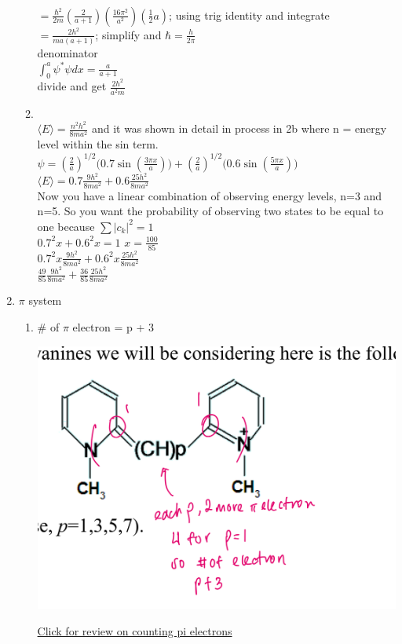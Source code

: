 \documentclass{article}
\begin{document}
\begin{enumerate}
\begin{enumerate}
\\ $= \frac{\hbar^2}{2m}(\frac{2}{a+1})(\frac{16\pi^2}{a^2})(\frac{1}{2}a)$; using trig identity and integrate
\\ $= \frac{2h^2}{ma(a+1)}$; simplify and $\hbar =\frac{h}{2\pi}$
\\ denominator
\\ $\int_0^a \psi^*\psi dx=\frac{a}{a+1}$
\\divide and get $\frac{2h^2}{a^2m}$
\item 
\\ $\langle E\rangle=\frac{n^2h^2}{8ma^2}$ and it was shown in detail in process in 2b where n = energy level within the sin term.
\\ $\psi = (\frac{2}{a})^{1/2}\Big(0.7\sin(\frac{3\pi x}{a})\Big) + (\frac{2}{a})^{1/2}\Big(0.6\sin(\frac{5\pi x}{a})\Big)$
\\ $\langle E\rangle = 0.7\frac{9h^2}{8ma^2} + 0.6\frac{25h^2}{8ma^2}$
\\ Now you have a linear combination of observing energy levels, n=3 and n=5. So you want the probability of observing two states to be equal to one because $\sum |c_k|^2=1$
\\ $0.7^2x+0.6^2x=1$ $x=\frac{100}{85}$
\\ $ 0.7^2x\frac{9h^2}{8ma^2} + 0.6^2x\frac{25h^2}{8ma^2}$
\\ $ \frac{49}{85}\frac{9h^2}{8ma^2} + \frac{36}{85}\frac{25h^2}{8ma^2}$
\end{enumerate}

\item $\pi$ system
    \begin{enumerate}
    \item # of $\pi$ electron = p + 3 
    \\\centerline{\includegraphics[scale=0.1]{99107.jpg}}
\href{https://www.youtube.com/watch?v=YwoASZrpDoc&t=212s&ab_channel=MichaelEvans}{Click for review on counting pi electrons} 


\end{enumerate}
\end{enumerate}
\end{document}
